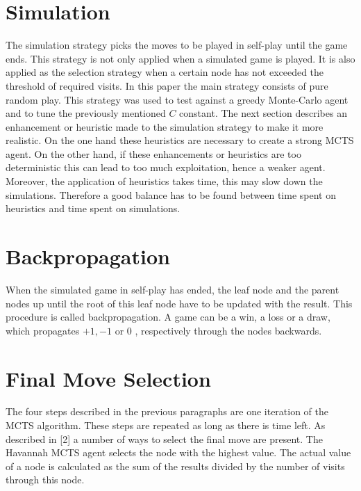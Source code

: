\documentclass[10pt]{article}
\begin{document}
\section*{Simulation}
The simulation strategy picks the moves to be played in self-play until the game ends. This strategy is not only applied when a simulated game is played. It is also applied as the selection strategy when a certain node has not exceeded the threshold of required visits. In this paper the main strategy consists of pure random play. This strategy was used to test against a greedy Monte-Carlo agent and to tune the previously mentioned $C$ constant. The next section describes an enhancement or heuristic made to the simulation strategy to make it more realistic. On the one hand these heuristics are necessary to create a strong MCTS agent. On the other hand, if these enhancements or heuristics are too deterministic this can lead to too much exploitation, hence a weaker agent. Moreover, the application of heuristics takes time, this may slow down the simulations. Therefore a good balance has to be found between time spent on heuristics and time spent on simulations.

\section*{Backpropagation}
When the simulated game in self-play has ended, the leaf node and the parent nodes up until the root of this leaf node have to be updated with the result. This procedure is called backpropagation. A game can be a win, a loss or a draw, which propagates $+1,-1$ or 0 , respectively through the nodes backwards.

\section*{Final Move Selection}
The four steps described in the previous paragraphs are one iteration of the MCTS algorithm. These steps are repeated as long as there is time left. As described in [2] a number of ways to select the final move are present. The Havannah MCTS agent selects the node with the highest value. The actual value of a node is calculated as the sum of the results divided by the number of visits through this node.
\end{document}
